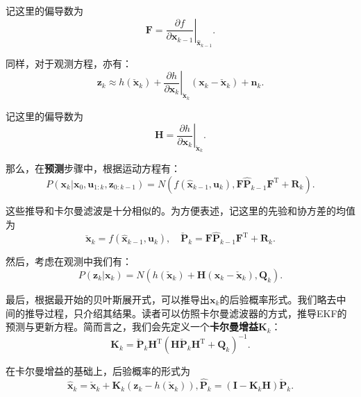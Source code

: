 记这里的偏导数为
\begin{equation}
\bm{F} = \left. {\frac{{\partial f}}{{\partial {\bm{x}_{k - 1}}}}} \right|_{{{\bm{\hat x}}_{k - 1}}}.
\end{equation}

同样，对于观测方程，亦有：
\begin{equation}
{\bm{z}_k} \approx h\left( {{{\bm{\check x}}_k}} \right) + {\left. {\frac{{\partial h}}{{\partial {\bm{x}_k}}}} \right|_{{{\bm{\check x}}_k}}}\left( {\bm{x}_k - {{\bm{\check x}}_k}} \right) + {\bm{n}_k}.
\end{equation}

记这里的偏导数为
\begin{equation}
\bm{H} = \left. {\frac{{\partial h}}{{\partial {\bm{x}_k}}}} \right|_{{{\bm{\check x}}_k}}.
\end{equation}

那么，在\textbf{预测}步骤中，根据运动方程有：
\begin{equation}
P\left( {{\bm{x}_k}|{\bm{x}_0},{\bm{u}_{1:k}},{\bm{z}_{0:k - 1}}} \right)
 = N(f\left( {{{\bm{\hat x}}_{k - 1}},{\bm{u}_k}} \right), \bm{F}\bm{\hat{P}}_{k-1} \bm{F}^\mathrm{T} + \bm{R}_k).
\end{equation}

这些推导和卡尔曼滤波是十分相似的。为方便表述，记这里的先验和协方差的均值为
\begin{equation}
\bm{\check {x}}_k = f\left( {{{\bm{\hat x}}_{k - 1}},{\bm{u}_k}} \right), \quad \bm{\check{P}}_k = \bm{F}\bm{\hat{P}}_{k-1} \bm{F}^\mathrm{T} + \bm{R}_k.
\end{equation}

然后，考虑在观测中我们有：
\begin{equation}
P\left( {{\bm{z}_k}|{\bm{x}_k}} \right) = N( h\left( {{{\bm{\check x}}_k}} \right) + \bm{H} \left( {\bm{x}_k - {{\bm{\check x}}_k}} \right), \bm{Q}_k ).
\end{equation}

最后，根据最开始的贝叶斯展开式，可以推导出$\bm{x}_k$的后验概率形式。我们略去中间的推导过程，只介绍其结果。读者可以仿照卡尔曼滤波器的方式，推导EKF的预测与更新方程。简而言之，我们会先定义一个\textbf{卡尔曼增益}$\bm{K}_k$：
\begin{equation}
\bm{K}_k = {\bm{\check{P}}_{k}}{\bm{H}^\mathrm{T}}{\left( {\bm{H}{\bm{\check P}_k}{\bm{H}^\mathrm{T}} + {\bm{Q}_k}} \right)^{ - 1}}.
\end{equation}

在卡尔曼增益的基础上，后验概率的形式为
\begin{equation}
{{\bm{\hat x}}_k} = {{\bm{\check x}}_k} + {\bm{K}_k}\left( {{\bm{z}_k} - h\left( {{\bm{\check x}_k}} \right)} \right),{\bm{\hat P}_k} = \left( {\bm{I} - {\bm{K}_k}{\bm{H}}} \right) \bm{\check{P}}_k.
\end{equation}

